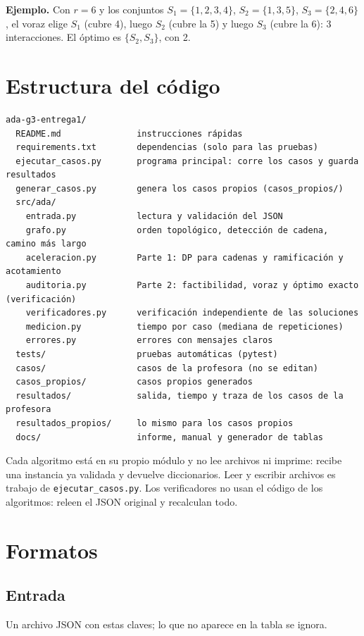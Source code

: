\documentclass[11pt,a4paper]{article}
\begin{document}
\textbf{Ejemplo.} Con $r=6$ y los conjuntos $S_1=\{1,2,3,4\}$, $S_2=\{1,3,5\}$, $S_3=\{2,4,6\}$, el voraz elige $S_1$ (cubre 4), luego $S_2$ (cubre la 5) y luego $S_3$ (cubre la 6): 3 interacciones. El óptimo es $\{S_2,S_3\}$, con 2.

\section{Estructura del código}

\begin{Verbatim}
ada-g3-entrega1/
  README.md               instrucciones rápidas
  requirements.txt        dependencias (solo para las pruebas)
  ejecutar_casos.py       programa principal: corre los casos y guarda resultados
  generar_casos.py        genera los casos propios (casos_propios/)
  src/ada/
    entrada.py            lectura y validación del JSON
    grafo.py              orden topológico, detección de cadena, camino más largo
    aceleracion.py        Parte 1: DP para cadenas y ramificación y acotamiento
    auditoria.py          Parte 2: factibilidad, voraz y óptimo exacto (verificación)
    verificadores.py      verificación independiente de las soluciones
    medicion.py           tiempo por caso (mediana de repeticiones)
    errores.py            errores con mensajes claros
  tests/                  pruebas automáticas (pytest)
  casos/                  casos de la profesora (no se editan)
  casos_propios/          casos propios generados
  resultados/             salida, tiempo y traza de los casos de la profesora
  resultados_propios/     lo mismo para los casos propios
  docs/                   informe, manual y generador de tablas
\end{Verbatim}

Cada algoritmo está en su propio módulo y no lee archivos ni imprime: recibe una instancia ya validada y devuelve diccionarios. Leer y escribir archivos es trabajo de \texttt{ejecutar\_casos.py}. Los verificadores no usan el código de los algoritmos: releen el JSON original y recalculan todo.

\section{Formatos}

\subsection{Entrada}

Un archivo JSON con estas claves; lo que no aparece en la tabla se ignora.
\end{document}
